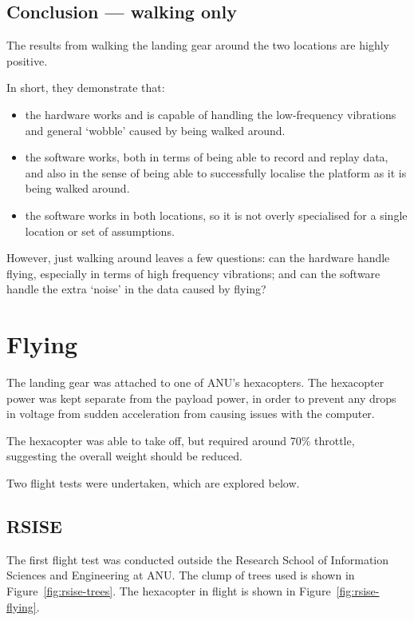 \documentclass[12pt,oneside,a4paper]{book}
\begin{document}
\subsection{Conclusion --- walking only}
\label{sec:concl-walk-only}

The results from walking the landing gear around the two locations are
highly positive.

In short, they demonstrate that:
\begin{itemize}
\item  the hardware works and is capable of
handling the low-frequency vibrations and general `wobble' caused by
being walked around.
\item the software works, both in terms of being able to record and
  replay data, and also in the sense of being able to successfully
  localise the platform as it is being walked around.
\item the software works in both locations, so it is not overly
  specialised for a single location or set of assumptions.
\end{itemize}

However, just walking around leaves a few questions: can the hardware
handle flying, especially in terms of high frequency vibrations; and
can the software handle the extra `noise' in the data caused by flying?

\section{Flying}
\label{sec:flying}

The landing gear was attached to one of ANU's hexacopters. The
hexacopter power was kept separate from the payload power, in order to
prevent any drops in voltage from sudden acceleration from causing
issues with the computer.

The hexacopter was able to take off, but required around 70\%
throttle, suggesting the overall weight should be reduced.

Two flight tests were undertaken, which are explored below.

\subsection{RSISE}
\label{sec:rsise}

The first flight test was conducted outside the Research School of
Information Sciences and Engineering at ANU. The clump of trees used
is shown in Figure~\ref{fig:rsise-trees}. The hexacopter in flight is
shown in Figure~\ref{fig:rsise-flying}.
\end{document}
